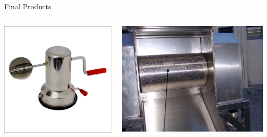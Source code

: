 \documentclass[10pt, svgnames]{beamer}
\begin{document}
\begin{frame}[label={sec:org58d81fd}]{Final Products}
\begin{columns}
  \begin{column}{0.5\columnwidth}
    \begin{center}
      \includegraphics[width=.9\linewidth]{./pictures/coconut-scraper.png}
    \end{center}
  \end{column}

  \begin{column}{0.5\columnwidth}
    \begin{center}
      \includegraphics[width=.9\linewidth]{./pictures/coconut-grinder.png}
    \end{center}
  \end{column}
\end{columns}
\end{frame}
\end{document}
